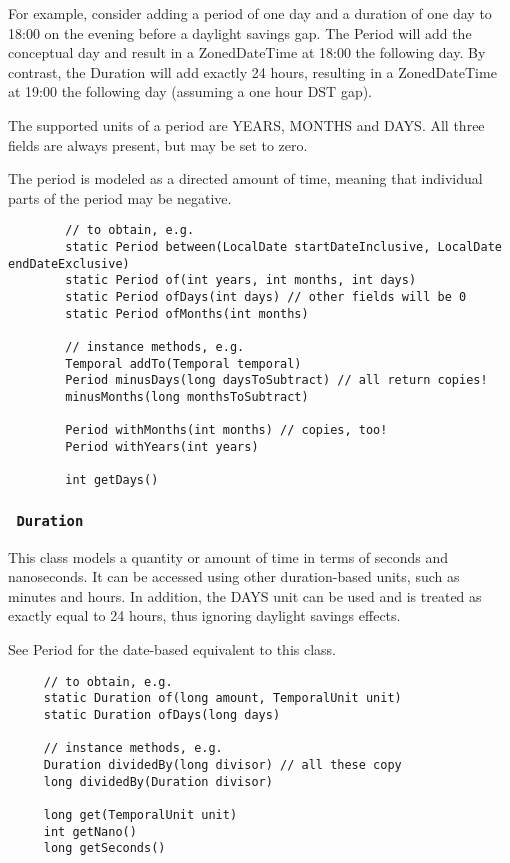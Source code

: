 \documentclass{scrartcl}
\begin{document}
    For example, consider adding a period of one day and a duration of one day to 18:00 on the evening before a daylight savings gap. The Period will add the conceptual day and result in a ZonedDateTime at 18:00 the following day. By contrast, the Duration will add exactly 24 hours, resulting in a ZonedDateTime at 19:00 the following day (assuming a one hour DST gap).

    The supported units of a period are YEARS, MONTHS and DAYS. All three fields are always present, but may be set to zero.

    The period is modeled as a directed amount of time, meaning that individual parts of the period may be negative.

    \begin{lstlisting}
        // to obtain, e.g.
        static Period between(LocalDate startDateInclusive, LocalDate endDateExclusive)
        static Period of(int years, int months, int days)
        static Period ofDays(int days) // other fields will be 0
        static Period ofMonths(int months)

        // instance methods, e.g.
        Temporal addTo(Temporal temporal)
        Period minusDays(long daysToSubtract) // all return copies!
        minusMonths(long monthsToSubtract)

        Period withMonths(int months) // copies, too!
        Period withYears(int years)

        int getDays()
        \end{lstlisting}

 \subsubsection{\lstinline$ Duration $}

    This class models a quantity or amount of time in terms of seconds and nanoseconds. It can be accessed using other duration-based units, such as minutes and hours. In addition, the DAYS unit can be used and is treated as exactly equal to 24 hours, thus ignoring daylight savings effects.

    See Period for the date-based equivalent to this class.

     \begin{lstlisting}
     // to obtain, e.g.
     static Duration of(long amount, TemporalUnit unit)
     static Duration ofDays(long days)

     // instance methods, e.g.
     Duration dividedBy(long divisor) // all these copy
     long dividedBy(Duration divisor)

     long get(TemporalUnit unit)
     int getNano()
     long getSeconds()
     \end{lstlisting}
\end{document}
